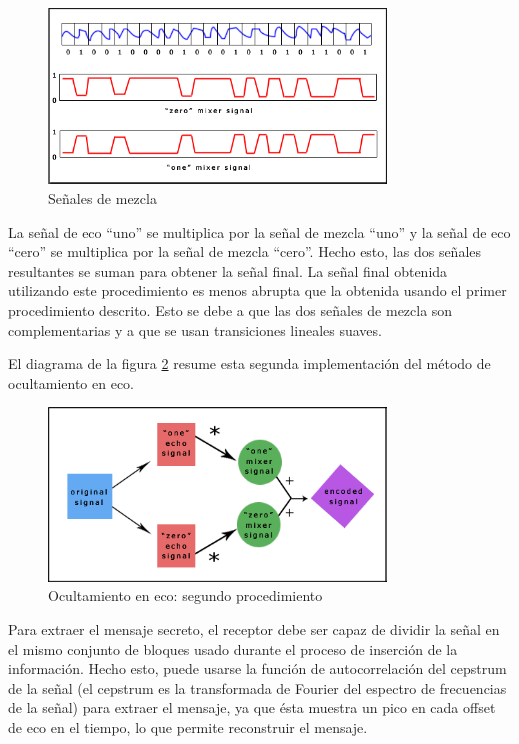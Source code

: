 \documentclass[12pt]{article}
\begin{document}
\begin{figure}
  \centering
    \includegraphics[width=0.8\textwidth]{img/mixersignals}
  \caption{Señales de mezcla}
  \label{mixersignals}
\end{figure}

La señal de eco ``uno'' se multiplica por la señal de mezcla ``uno'' y la señal de eco ``cero'' se multiplica por la señal de mezcla ``cero''. Hecho esto, las dos señales resultantes se suman para obtener la señal final. La señal final obtenida utilizando este procedimiento es menos abrupta que la obtenida usando el primer procedimiento descrito. Esto se debe a que las dos señales de mezcla son complementarias y a que se usan transiciones lineales suaves.

El diagrama de la figura \ref{echo2ndimp} resume esta segunda implementación del método de ocultamiento en eco.

\begin{figure}
  \centering
    \includegraphics[width=0.8\textwidth]{img/echo2ndimp}
  \caption{Ocultamiento en eco: segundo procedimiento}
  \label{echo2ndimp}
\end{figure}

Para extraer el mensaje secreto, el receptor debe ser capaz de dividir la señal en el mismo conjunto de bloques usado durante el proceso de inserción de la información. Hecho esto, puede usarse la función de autocorrelación del cepstrum de la señal (el cepstrum es la transformada de Fourier del espectro de frecuencias de la señal) para extraer el mensaje, ya que ésta muestra un pico en cada offset de eco en el tiempo, lo que permite reconstruir el mensaje.
\end{document}
